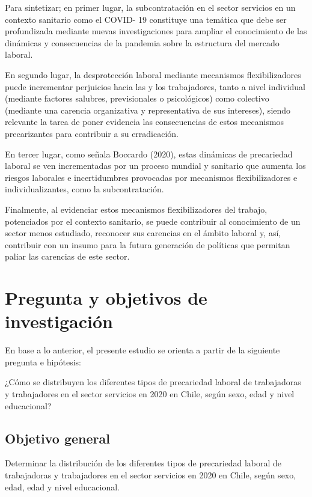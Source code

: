 \documentclass[
]{article}
\begin{document}
Para sintetizar; en primer lugar, la subcontratación en el sector
servicios en un contexto sanitario como el COVID- 19 constituye una
temática que debe ser profundizada mediante nuevas investigaciones para
ampliar el conocimiento de las dinámicas y consecuencias de la pandemia
sobre la estructura del mercado laboral.

En segundo lugar, la desprotección laboral mediante mecanismos
flexibilizadores puede incrementar perjuicios hacia las y los
trabajadores, tanto a nivel individual (mediante factores salubres,
previsionales o psicológicos) como colectivo (mediante una carencia
organizativa y representativa de sus intereses), siendo relevante la
tarea de poner evidencia las consecuencias de estos mecanismos
precarizantes para contribuir a su erradicación.

En tercer lugar, como señala Boccardo (2020), estas dinámicas de
precariedad laboral se ven incrementadas por un proceso mundial y
sanitario que aumenta los riesgos laborales e incertidumbres provocadas
por mecanismos flexibilizadores e individualizantes, como la
subcontratación.

Finalmente, al evidenciar estos mecanismos flexibilizadores del trabajo,
potenciados por el contexto sanitario, se puede contribuir al
conocimiento de un sector menos estudiado, reconocer sus carencias en el
ámbito laboral y, así, contribuir con un insumo para la futura
generación de políticas que permitan paliar las carencias de este
sector.

\hypertarget{pregunta-y-objetivos-de-investigaciuxf3n}{%
\section{Pregunta y objetivos de
investigación}\label{pregunta-y-objetivos-de-investigaciuxf3n}}

En base a lo anterior, el presente estudio se orienta a partir de la
siguiente pregunta e hipótesis:

¿Cómo se distribuyen los diferentes tipos de precariedad laboral de
trabajadoras y trabajadores en el sector servicios en 2020 en Chile,
según sexo, edad y nivel educacional?

\hypertarget{objetivo-general}{%
\subsection{Objetivo general}\label{objetivo-general}}

Determinar la distribución de los diferentes tipos de precariedad
laboral de trabajadoras y trabajadores en el sector servicios en 2020 en
Chile, según sexo, edad, edad y nivel educacional.
\end{document}
